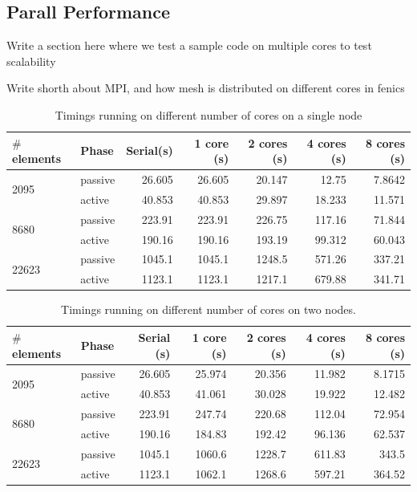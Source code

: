 \subsection{Parall Performance}
Write a section here where we test a sample code on multiple cores to
test scalability

Write shorth about MPI, and how mesh is distributed on different
cores in fenics


\begin{table}
  \centering
    \begin{tabular}{llrrrrr}
\hline
   $\#$ elements & Phase & Serial(s) & 1 core (s)& 2 cores (s) &  4 cores (s)&  8 cores (s)\\
\hline
      \multirow{2}{*}{2095} & passive &   26.605 &   26.605 &   20.147 &  12.75 &   7.8642 \\
                      & active &    40.853 &   40.853 &   29.897 &  18.233 &  11.571 \\
      \multirow{2}{*}{8680} & passive & 223.91  &  223.91  &  226.75  & 117.16 &  71.844  \\
                      & active &   190.16  &  190.16  &  193.19  &  99.312 &  60.043 \\
      \multirow{2}{*}{22623} & passive &   1045.1   & 1045.1   & 1248.5   & 571.26 & 337.21   \\
                         & active &   1123.1   & 1123.1   & 1217.1   & 679.88  & 341.71  \\
\hline
    \end{tabular}
    \caption{\label{}Timings running on different number of cores on a
      single node}
  \end{table}


\begin{table}
  \centering
    \begin{tabular}{llrrrrr}
\hline
   $\#$ elements & Phase & Serial (s)& 1 core (s)& 2 cores (s) &  4 cores (s)&  8 cores (s)\\
\hline
      \multirow{2}{*}{2095} & passive &   26.605 &   25.974 &   20.356 &  11.982 &   8.1715 \\
                      & active &   40.853 &   41.061 &   30.028 &  19.922 &  12.482 \\
      \multirow{2}{*}{8680} & passive & 223.91  &  247.74  &  220.68  & 112.04  &  72.954  \\
                      & active &  190.16  &  184.83  &  192.42  &  96.136 &  62.537 \\
      \multirow{2}{*}{22623} & passive &  1045.1   & 1060.6   & 1228.7   & 611.83  & 343.5    \\
                         & active &  1123.1   & 1062.1   & 1268.6   & 597.21  & 364.52  \\
\hline
    \end{tabular}
    \caption{\label{}Timings running on different number of cores
      on two nodes.}
  \end{table}



